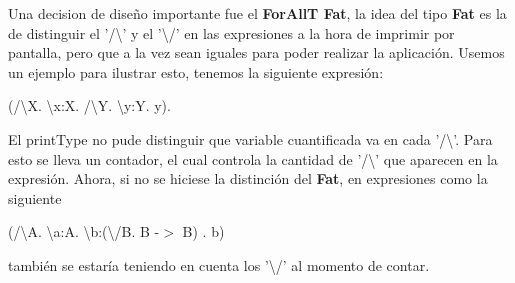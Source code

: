 \documentclass[12pt, titlepage, a4paper]{article}
\begin{document}
  Una decision de diseño importante fue el \textbf{ForAllT Fat}, la idea del tipo \textbf{Fat} es la de distinguir el '/\textbackslash' y el '\textbackslash /' 
  en las expresiones a la hora de imprimir por pantalla, pero que a la vez sean iguales para poder realizar la aplicación. Usemos un ejemplo para ilustrar esto, 
  tenemos la siguiente expresión:

  \begin{center}
    (/\textbackslash X. \textbackslash x:X. /\textbackslash Y. \textbackslash y:Y. y).
  \end{center} 

  El printType no pude distinguir que variable cuantificada va en cada '/\textbackslash'. Para esto se lleva un contador, el cual controla la cantidad de 
  '/\textbackslash' que aparecen en la expresión. Ahora, si no se hiciese la distinción del \textbf{Fat}, en expresiones como la siguiente 

  \begin{center}
    (/\textbackslash A. \textbackslash a:A. \textbackslash b:(\textbackslash /B. B -$>$ B) . b)
  \end{center}  

  también se estaría teniendo en cuenta los '\textbackslash /' al momento de contar.


  
  
\end{document}
